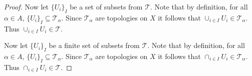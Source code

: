\documentclass[minion]{homework651}
\begin{document}
\begin{problems}
\begin{proof}
    Now let $\{U_i\}_I$ be a set of subsets from $\mathcal{T}$. Note that by definition, for all $\alpha \in A$, $\{U_i\}_I \subseteq \mathcal{T}_\alpha$. Since $\mathcal{T}_\alpha$ are topologies on $X$ it follows that $\cup_{i \in I} U_i \in \mathcal{T}_\alpha$. Thus $\cup_{i \in I} U_i \in \mathcal{T}$.


    Now let $\{U_i\}_I$ be a finite set of subsets from $\mathcal{T}$. Note that by definition, for all $\alpha \in A$, $\{U_i\}_I \subseteq \mathcal{T}_\alpha$. Since $\mathcal{T}_\alpha$ are topologies on $X$ it follows that $\cap_{i \in I} U_i \in \mathcal{T}_\alpha$. Thus $\cap_{i \in I} U_i \in \mathcal{T}$.
\end{proof}



\end{problems}
\end{document}
